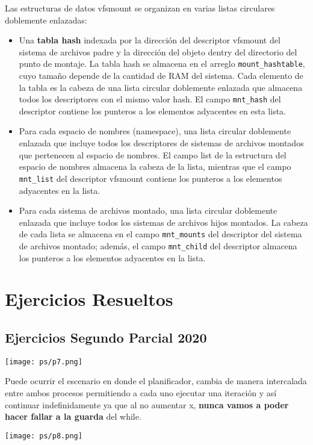 \documentclass[openany]{book}
\begin{document}
Las estructuras de datos vfsmount se organizan en varias listas circulares doblemente enlazadas:
\begin{itemize}
    \item Una \textbf{tabla hash} indexada por la dirección del descriptor vfsmount del sistema de archivos padre y la dirección del objeto dentry del directorio del punto de montaje. La tabla hash se almacena en el arreglo \texttt{mount\_hashtable}, cuyo tamaño depende de la cantidad de RAM del sistema. Cada elemento de la tabla es la cabeza de una lista circular doblemente enlazada que almacena todos los descriptores con el mismo valor hash. El campo \texttt{mnt\_hash} del descriptor contiene los punteros a los elementos adyacentes en esta lista.
    \item Para cada espacio de nombres (namespace), una lista circular doblemente enlazada que incluye todos los descriptores de sistemas de archivos montados que pertenecen al espacio de nombres. El campo list de la estructura del espacio de nombres almacena la cabeza de la lista, mientras que el campo \texttt{mnt\_list} del descriptor vfsmount contiene los punteros a los elementos adyacentes en la lista.
    \item Para cada sistema de archivos montado, una lista circular doblemente enlazada que incluye todos los sistemas de archivos hijos montados. La cabeza de cada lista se almacena en el campo \texttt{mnt\_mounts} del descriptor del sistema de archivos montado; además, el campo \texttt{mnt\_child} del descriptor almacena los punteros a los elementos adyacentes en la lista.
\end{itemize}


\newpage
\chapter{Ejercicios Resueltos}

\section*{Ejercicios Segundo Parcial 2020}
\texttt{[image: ps/p7.png]}
\begin{rta}
    Puede ocurrir el escenario en donde el planificador, cambia de manera intercalada entre ambos procesos permitiendo a cada uno ejecutar una iteración y así continuar indefinidamente ya que al no aumentar x, \textbf{nunca vamos a poder hacer fallar a la guarda} del while. 
\end{rta}
\texttt{[image: ps/p8.png]}
\end{document}
